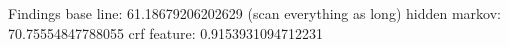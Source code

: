 Findings
	base line: 61.18679206202629 (scan everything as long)
	hidden markov: 70.75554847788055
	crf feature: 0.9153931094712231

